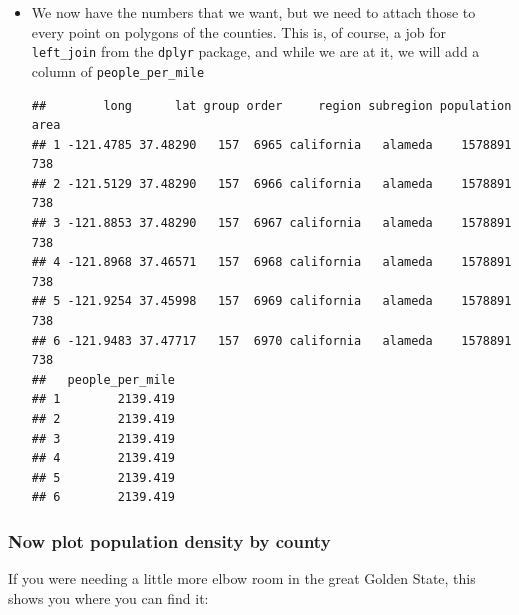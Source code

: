 \documentclass[]{book}
\newenvironment{Shaded}{\begin{snugshade}}{\end{snugshade}}
\newcommand{\KeywordTok}[1]{\textcolor[rgb]{0.13,0.29,0.53}{\textbf{{#1}}}}
\newcommand{\DataTypeTok}[1]{\textcolor[rgb]{0.13,0.29,0.53}{{#1}}}
\newcommand{\StringTok}[1]{\textcolor[rgb]{0.31,0.60,0.02}{{#1}}}
\newcommand{\NormalTok}[1]{{#1}}
\theoremstyle{definition}
\theoremstyle{definition}
\theoremstyle{remark}
\begin{document}
\begin{itemize}
\item
  We now have the numbers that we want, but we need to attach those to
  every point on polygons of the counties. This is, of course, a job for
  \texttt{left\_join} from the \texttt{dplyr} package, and while we are
  at it, we will add a column of \texttt{people\_per\_mile}

\begin{Shaded}
\end{Shaded}

\begin{verbatim}
##        long      lat group order     region subregion population area
## 1 -121.4785 37.48290   157  6965 california   alameda    1578891  738
## 2 -121.5129 37.48290   157  6966 california   alameda    1578891  738
## 3 -121.8853 37.48290   157  6967 california   alameda    1578891  738
## 4 -121.8968 37.46571   157  6968 california   alameda    1578891  738
## 5 -121.9254 37.45998   157  6969 california   alameda    1578891  738
## 6 -121.9483 37.47717   157  6970 california   alameda    1578891  738
##   people_per_mile
## 1        2139.419
## 2        2139.419
## 3        2139.419
## 4        2139.419
## 5        2139.419
## 6        2139.419
\end{verbatim}
\end{itemize}

\subsubsection{Now plot population density by
county}\label{now-plot-population-density-by-county}

If you were needing a little more elbow room in the great Golden State,
this shows you where you can find it:
\end{document}
